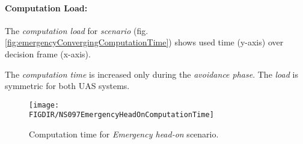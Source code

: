 \paragraph{Computation Load:} The \emph{computation load} for \emph{scenario} (fig.\ref{fig:emergencyConvergingComputationTime}) shows used time (y-axis) over decision frame (x-axis).

The \emph{computation time} is increased only during the \emph{avoidance phase}. The \emph{load} is symmetric for both UAS systems.

\begin{figure}[H]
    \centering
    \texttt{[image: \\FIGDIR/NS097EmergencyHeadOnComputationTime]} 
    \caption{Computation time for \emph{Emergency head-on} scenario.}
    \label{fig:emergencyHeadOnComputationTime}
\end{figure}